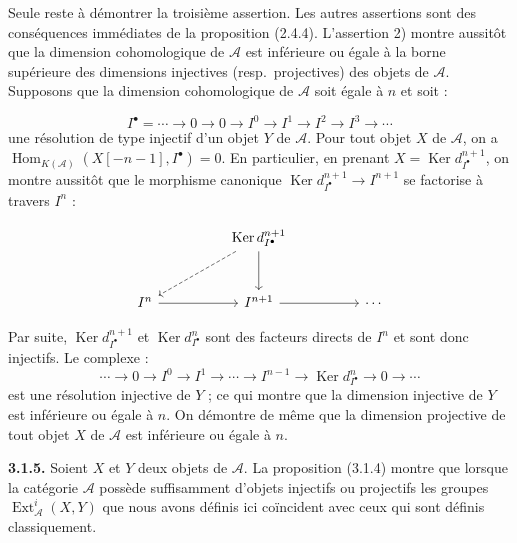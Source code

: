 \clearpage
{}%
\begingroup\small\setlength{\parskip}{0pt}\setlength{\emergencystretch}{1.5em}
\setlength{\abovedisplayskip}{4pt plus 2pt minus 2pt}%
\setlength{\belowdisplayskip}{4pt plus 2pt minus 2pt}%

Seule reste à démontrer la troisième assertion. Les autres assertions sont
des conséquences immédiates de la proposition (2.4.4). L'assertion 2) montre
aussitôt que la dimension cohomologique de $\mathcal A$ est inférieure ou
égale à la borne supérieure des dimensions injectives (resp.\ projectives) des
objets de $\mathcal A$. Supposons que la dimension cohomologique de
$\mathcal A$ soit égale à $n$ et soit :

\[
I^\bullet=\cdots\longrightarrow0\longrightarrow0\longrightarrow I^0
\longrightarrow I^1\longrightarrow I^2\longrightarrow I^3
\longrightarrow\cdots
\]
une résolution de type injectif d'un objet $Y$ de $\mathcal A$. Pour tout
objet $X$ de $\mathcal A$, on a
$\operatorname{Hom}_{K(\mathcal A)}(X[-n-1],I^\bullet)=0$. En particulier,
en prenant $X=\operatorname{Ker}d_{I^\bullet}^{n+1}$, on montre aussitôt que
le morphisme canonique
$\operatorname{Ker}d_{I^\bullet}^{n+1}\longrightarrow I^{n+1}$ se factorise
à travers $I^n$ :

\[
\begin{tikzcd}[column sep=4.8em,row sep=2.8em]
{} & \operatorname{Ker}d_{I^\bullet}^{n+1}
  \arrow[dl,dashed] \arrow[d] & {} \\
I^n \arrow[r] & I^{n+1} \arrow[r] & \cdots
\end{tikzcd}
\]

Par suite, $\operatorname{Ker}d_{I^\bullet}^{n+1}$ et
$\operatorname{Ker}d_{I^\bullet}^{n}$ sont des facteurs directs de $I^n$ et
sont donc injectifs. Le complexe :
\[
\cdots\longrightarrow0\longrightarrow I^0\longrightarrow I^1
\longrightarrow\cdots\longrightarrow I^{n-1}
\longrightarrow\operatorname{Ker}d_{I^\bullet}^{n}
\longrightarrow0\longrightarrow\cdots
\]
est une résolution injective de $Y$ ; ce qui montre que la dimension
injective de $Y$ est inférieure ou égale à $n$. On démontre de même que la
dimension projective de tout objet $X$ de $\mathcal A$ est inférieure ou
égale à $n$.

\medskip\noindent\textbf{3.1.5.}\quad
Soient $X$ et $Y$ deux objets de $\mathcal A$. La proposition (3.1.4) montre
que lorsque la catégorie $\mathcal A$ possède suffisamment d'objets injectifs
ou projectifs les groupes $\operatorname{Ext}_{\mathcal A}^{i}(X,Y)$ que
nous avons définis ici coïncident avec ceux qui sont définis classiquement.


